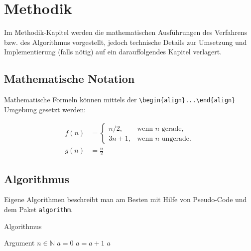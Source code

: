 \chapter{Methodik}
\label{ch:methodik}

Im Methodik-Kapitel werden die mathematischen Ausführungen des Verfahrens bzw. des Algorithmus vorgestellt, jedoch technische Details zur Umsetzung und Implementierung (falls nötig) auf ein darauffolgendes Kapitel verlagert.


\section{Mathematische Notation}
\label{s:notation}

Mathematische Formeln können mittels der \verb+\begin{align}...\end{align}+ Umgebung gesetzt werden:

\begin{align}
f(n) & =
	\begin{cases}
		n/2, & \text{wenn }n\text{ gerade,}\\
		3n+1, & \text{wenn }n\text{ ungerade.}
	\end{cases}
\label{eq:f} \\
%
g(n) & = \frac{n}{2} \label{eq:g}
\end{align}

\section{Algorithmus}
\label{s:algorithmus}

Eigene Algorithmen beschreibt man am Besten mit Hilfe von Pseudo-Code und dem Paket \verb+algorithm+.

\begin{algorithm}
\caption{Algorithmus}
\label{alg:alg}
\begin{algorithmic}

\REQUIRE Argument $n\in\mathbb{N}$
\STATE $a = 0$
	\STATE $a = a + 1$
\ENDFOR
\RETURN $a$
\end{algorithmic}
\end{algorithm}
